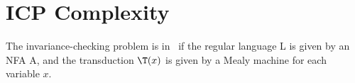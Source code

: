 
\section{ICP Complexity}\label{sec:c03-icp-complexity}

\begin{theorem}
	The invariance-checking problem is in \psp\ if the regular language L is given by an NFA A, and the transduction $\T(x)$ is given by a
	Mealy machine for each variable $x$.
\end{theorem}

